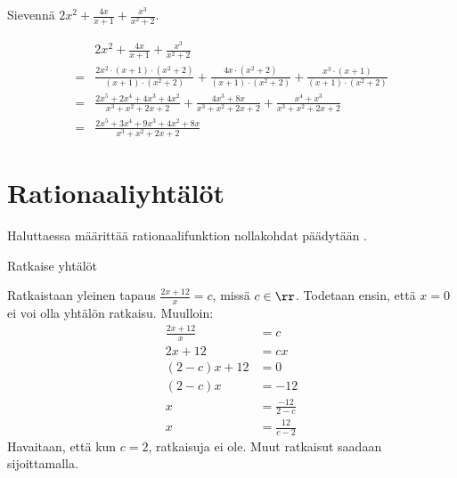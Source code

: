\begin{esimerkki}
	Sievennä $2x^2 + \frac{4x}{x+1} + \frac{x^3}{x^2+2}$.
	\begin{esimratk}
		\begin{align*}
			  &2x^2 + \frac{4x}{x+1} + \frac{x^3}{x^2+2} \\
			= &\frac{2x^2 \cdot (x+1) \cdot (x^2+2)}{(x+1) \cdot (x^2+2)} + \frac{4x \cdot (x^2+2)}{(x+1) \cdot (x^2+2)} + \frac{x^3 \cdot (x+1)}{(x+1) \cdot (x^2+2)} \\
			= &\frac{2x^5 + 2x^4 + 4x^3 + 4x^2}{x^3+x^2+2x+2} + \frac{4x^3+8x}{x^3+x^2+2x+2} + \frac{x^4+x^3}{x^3+x^2+2x+2} \\
			= &\frac{2x^5+3x^4+9x^3+4x^2+8x}{x^3+x^2+2x+2}
		\end{align*}
	\end{esimratk}
\end{esimerkki}


\section{Rationaaliyhtälöt}

Haluttaessa määrittää rationaalifunktion nollakohdat päädytään .

\begin{esimerkki}
	Ratkaise yhtälöt
	\begin{alakohdat}
	\end{alakohdat}
	\begin{esimratk}
		Ratkaistaan yleinen tapaus $\frac{2x+12}{x} = c$, missä $c \in \rr$.
		Todetaan ensin, että $x = 0$ ei voi olla yhtälön ratkaisu. Muulloin:
		\begin{align*}
			\frac{2x+12}{x} &= c \\
			2x+12 &= cx \\
			(2-c)x+12 &= 0 \\
			(2-c)x &= -12 \\
			x &= \frac{-12}{2-c} \\
			x &= \frac{12}{c-2}
		\end{align*}
		Havaitaan, että kun $c = 2$, ratkaisuja ei ole. Muut ratkaisut saadaan sijoittamalla.
	\end{esimratk}
	\begin{esimvast}
		\begin{alakohdat}
			\alakohta{$x = 2$}
			\alakohta{ei ratkaisuja}
			\alakohta{$x = -2$}
		\end{alakohdat}
	\end{esimvast}
\end{esimerkki}

